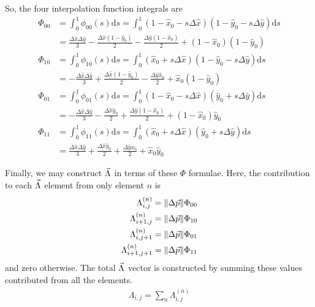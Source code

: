So, the four interpolation function integrals are
\begin{subequations}
\begin{align}
\Phi_{00} &= \int_0^1 \phi_{00}(s) \mathrm{d}s = \int_0^1 (1-\hat{x}_0 - s\Delta\hat{x})(1-\hat{y}_0-s\Delta\hat{y})\mathrm{d}s\nonumber\\
 &= \frac{\Delta \hat{x} \Delta \hat{y}}{3} - \frac{\Delta \hat{x} (1-\hat{y}_0)}{2} - \frac{\Delta \hat{y} (1-\hat{x}_0)}{2} + (1-\hat{x}_0)(1-\hat{y}_0)\\
\Phi_{10} &= \int_0^1 \phi_{10}(s) \mathrm{d}s = \int_0^1 (\hat{x}_0 + s\Delta\hat{x})(1-\hat{y}_0-s\Delta\hat{y})\mathrm{d}s\nonumber\\
 &= -\frac{\Delta \hat{x} \Delta \hat{y}}{3} + \frac{\Delta \hat{x} (1-\hat{y}_0)}{2} - \frac{\Delta \hat{y} \hat{x}_0}{2} + \hat{x}_0(1-\hat{y}_0)\\
\Phi_{01} &= \int_0^1 \phi_{01}(s) \mathrm{d}s = \int_0^1 (1 - \hat{x}_0 - s\Delta\hat{x})(\hat{y}_0+s\Delta\hat{y})\mathrm{d}s\nonumber\\
 &= -\frac{\Delta \hat{x} \Delta \hat{y}}{3} - \frac{\Delta \hat{x} \hat{y}_0}{2} + \frac{\Delta \hat{y} (1-\hat{x}_0)}{2} + (1-\hat{x}_0)\hat{y}_0\\
\Phi_{11} &= \int_0^1 \phi_{11}(s) \mathrm{d}s = \int_0^1 (\hat{x}_0 + s\Delta\hat{x})(\hat{y}_0+s\Delta\hat{y})\mathrm{d}s\nonumber\\
 &= \frac{\Delta \hat{x} \Delta \hat{y}}{3} + \frac{\Delta \hat{x} \hat{y}_0}{2} + \frac{\Delta \hat{y} x_0}{2} + \hat{x}_0 \hat{y}_0
\end{align}
\end{subequations}

Finally, we may construct $\vec{\Lambda}$ in terms of these $\Phi$ formulae.  Here, the contribution to each $\vec{\Lambda}$ element from only element $n$ is
\begin{subequations}\label{eqn:lambda:n}
\begin{align}
\Lambda_{i,j}^{(n)} &= \|\Delta \vec{p}\| \Phi_{00}\\
\Lambda_{i+1,j}^{(n)} &= \|\Delta \vec{p}\| \Phi_{10}\\
\Lambda_{i,j+1}^{(n)} &= \|\Delta \vec{p}\| \Phi_{01}\\
\Lambda_{i+1,j+1}^{(n)} &= \|\Delta \vec{p}\| \Phi_{11}
\end{align}
\end{subequations}
and zero otherwise.  The total $\vec{\Lambda}$ vector is constructed by summing these values contributed from all the elements.
\begin{align}
\Lambda_{i,j} = \sum_n \Lambda_{i,j}^{(n)}
\end{align}
